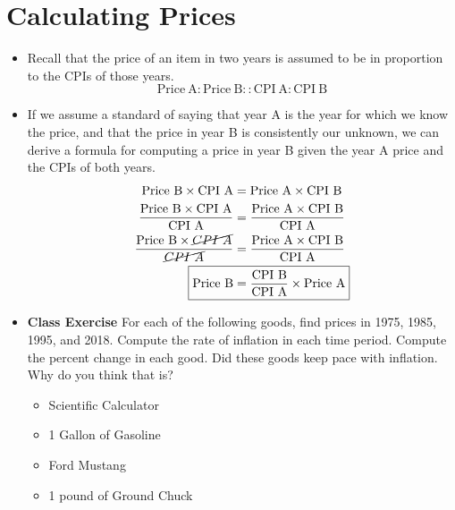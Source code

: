 \documentclass{article}
\begin{document}
\section*{Calculating Prices}
\begin{itemize}
    \item Recall that the price of an item in two years is assumed to be in proportion to the CPIs of those years.
    \[
    \mathrm{Price\ A : Price\ B :: CPI\ A : CPI\ B}
    \]
    \item If we assume a standard of saying that year A is the year for which we know the price, and that the price in year B is consistently our unknown, we can derive a formula for computing a price in year B given the year A price and the CPIs of both years.
    \begin{align*}
    \mathrm{Price\ B \times CPI\ A} &= \mathrm{Price\ A \times CPI\ B}\\
    \dfrac{\mathrm{Price\ B \times CPI\ A}}{\mathrm{CPI\ A}} &= \dfrac{\mathrm{Price\ A \times CPI\ B}}{\mathrm{CPI\ A}}\\
    \dfrac{\mathrm{Price\ B \times \cancel{CPI\ A}}}{\mathrm{\cancel{CPI\ A}}} &= \dfrac{\mathrm{Price\ A\times CPI\ B}}{\mathrm{CPI\ A}}\\
    \Aboxed{\mathrm{Price\ B} &= \dfrac{\mathrm{CPI\ B}}{\mathrm{CPI\ A}} \times \mathrm{Price\ A}}
    \end{align*}
\item {\bf Class Exercise} For each of the following goods, find prices in 1975, 1985, 1995, and 2018.  Compute the rate of inflation in each time period.  Compute the percent change in each good.  Did these goods keep pace with inflation.  Why do you think that is?
    \begin{itemize}
        \item Scientific Calculator
        \item 1 Gallon of Gasoline
        \item Ford Mustang
        \item 1 pound of Ground Chuck
    \end{itemize}
\end{itemize}
\end{document}
